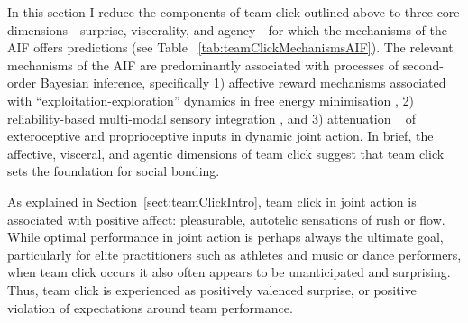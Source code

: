 \begin{CJK}{UTF8}{gbsn}
\newpage
{} %
\begin{landscape}

\end{landscape}
\restoregeometry



In this section I reduce the components of team click outlined above to three core dimensions---surprise, viscerality, and agency---for which the mechanisms of the AIF offers predictions (see Table ~\ref{tab:teamClickMechanismsAIF}).  The relevant mechanisms of the AIF are predominantly associated with processes of second-order Bayesian inference, specifically 1) affective reward mechanisms associated with ``exploitation-exploration'' dynamics in free energy minimisation \citep{Friston2012,Schwartenbeck2013,FitzGerald2014,Chetverikov2016}, 2) reliability-based multi-modal sensory integration \citep{Ernst2004}, and 3) attenuation ~\citep{Frith2007,Friston2015} of exteroceptive and proprioceptive inputs in dynamic joint action.  In brief, the affective, visceral, and agentic dimensions of team click suggest that team click sets the foundation for social bonding.


As explained in Section~\ref{sect:teamClickIntro}, team click in joint action is associated with positive affect: pleasurable, autotelic sensations of rush or flow.  While optimal performance in joint action is perhaps always the ultimate goal, particularly for elite practitioners such as athletes and music or dance performers, when team click occurs it also often appears to be unanticipated and surprising.  Thus, team click is experienced as positively valenced surprise, or positive violation of expectations around team performance.


\end{CJK}
